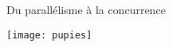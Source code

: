 
\begingroup

\begin{frame}{Du parallélisme à la concurrence}

  \begin{center}
    \texttt{[image: pupies]}
  \end{center}

\end{frame}

\endgroup
\endinput
